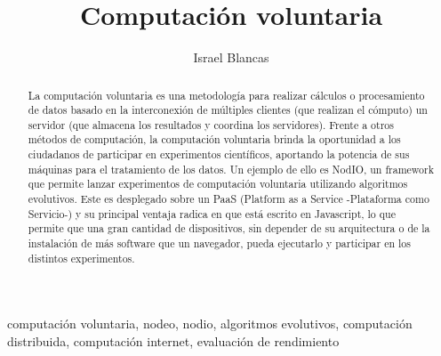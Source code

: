 \documentclass[runningheads,a4paper]{llncs}
\begin{document}
\mainmatter  %

\title{Computaci\'on voluntaria}


%
\author{Israel Blancas }
%




\maketitle


\begin{abstract}
La computaci\'on voluntaria es una metodolog\'ia para realizar c\'alculos o procesamiento
de datos basado en la interconexi\'on de m\'ultiples clientes (que realizan el c\'omputo)
un servidor (que almacena los resultados y coordina los servidores). Frente a otros m\'etodos
de computaci\'on, la computaci\'on voluntaria brinda la oportunidad a los ciudadanos
de participar en experimentos cient\'ificos, aportando la potencia de sus m\'aquinas
para el tratamiento de los datos. Un ejemplo de ello es NodIO, un framework
que permite lanzar experimentos de computaci\'on voluntaria utilizando algoritmos
evolutivos. Este es desplegado sobre un PaaS (Platform as a Service -Plataforma como Servicio-)
y su principal ventaja radica en que est\'a escrito en Javascript, lo que permite
que una gran cantidad de dispositivos, sin depender de su arquitectura o de la
instalaci\'on de m\'as software que un navegador, pueda ejecutarlo y participar
en los distintos experimentos.
\end{abstract}


\begin{keywords}
  computaci\'on voluntaria, nodeo, nodio, algoritmos evolutivos, computaci\'on distribuida,
  computaci\'on internet, evaluaci\'on de rendimiento
\end{keywords}
\end{document}
